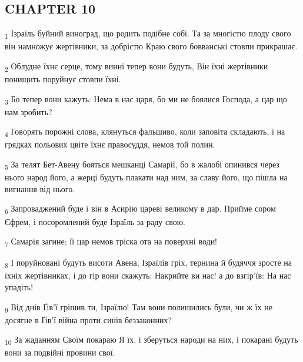 \subsection{CHAPTER 10}
\begin{tcolorbox}
\textsubscript{1} Ізраїль буйний виноград, що родить подібне собі. Та за многістю плоду свого він намножує жертівники, за добрістю Краю свого бовванські стовпи прикрашає.
\end{tcolorbox}
\begin{tcolorbox}
\textsubscript{2} Облудне їхнє серце, тому винні тепер вони будуть, Він їхні жертівники понищить поруйнує стовпи їхні.
\end{tcolorbox}
\begin{tcolorbox}
\textsubscript{3} Бо тепер вони кажуть: Нема в нас царя, бо ми не боялися Господа, а цар що нам зробить?
\end{tcolorbox}
\begin{tcolorbox}
\textsubscript{4} Говорять порожні слова, клянуться фальшиво, коли заповіта складають, і на грядках польових цвіте їхнє правосуддя, немов той полин.
\end{tcolorbox}
\begin{tcolorbox}
\textsubscript{5} За телят Бет-Авену бояться мешканці Самарії, бо в жалобі опинився через нього народ його, а жерці будуть плакати над ним, за славу його, що пішла на вигнання від нього.
\end{tcolorbox}
\begin{tcolorbox}
\textsubscript{6} Запроваджений буде і він в Асирію цареві великому в дар. Прийме сором Єфрем, і посоромлений буде Ізраїль за раду свою.
\end{tcolorbox}
\begin{tcolorbox}
\textsubscript{7} Самарія загине; її цар немов тріска ота на поверхні води!
\end{tcolorbox}
\begin{tcolorbox}
\textsubscript{8} І поруйновані будуть висоти Авена, Ізраїлів гріх, тернина й будяччя зросте на їхніх жертівниках, і до гір вони скажуть: Накрийте ви нас! а до взгір'їв: На нас упадіть!
\end{tcolorbox}
\begin{tcolorbox}
\textsubscript{9} Від днів Ґів'ї грішив ти, Ізраїлю! Там вони полишились були, чи ж їх не досягне в Ґів'ї війна проти синів беззаконних?
\end{tcolorbox}
\begin{tcolorbox}
\textsubscript{10} За жаданням Своїм покараю Я їх, і зберуться народи на них, і покарані будуть вони за подвійні провини свої.
\end{tcolorbox}
